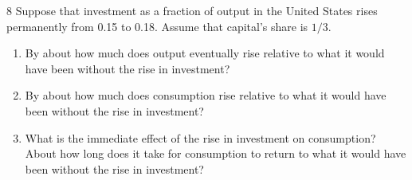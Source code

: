 \begin{problem}{8}
Suppose that investment as a fraction of output in the United States rises permanently from 0.15
to 0.18. Assume that capital's share is \(1/3\).
\begin{enumerate}[label=(\alph*)]
    \item By about how much does output eventually rise relative to what it would have been without the rise in investment?
    \item By about how much does consumption rise relative to what it would have been without the rise in investment?
    \item What is the immediate effect of the rise in investment on consumption? About how long
    does it take for consumption to return to what it would have been without the rise in investment?
\end{enumerate}
\end{problem}

